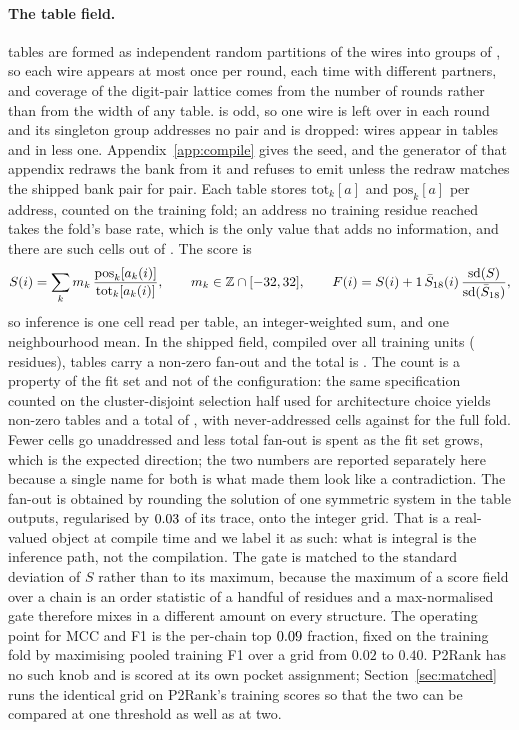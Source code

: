 \documentclass[11pt]{article}
\begin{document}
\paragraph{The table field.} \NTabTables{} tables are formed as \TabRounds{}
independent random partitions of the \NTabWires{} wires into groups of
\TabWidth{}, so each wire appears at most once per round, each time with
different partners, and coverage of the digit-pair lattice comes from the number
of rounds rather than from the width of any table. \NTabWires{} is odd, so one
wire is left over in each round and its singleton group addresses no pair and is
dropped: \NWireFull{} wires appear in \TabRounds{} tables and \NWireShort{} in
\TabRounds{} less one. Appendix~\ref{app:compile} gives the seed, and the
generator of that appendix redraws the bank from it and refuses to emit unless
the redraw matches the shipped bank pair for pair. Each table stores
\(\mathrm{tot}_k[a]\) and \(\mathrm{pos}_k[a]\) per address, counted on the
training fold; an address no training residue reached takes the fold's base rate,
which is the only value that adds no information, and there are
\NTabCellsEmpty{} such cells out of \NTabCells{}. The score is
\[
S(i)=\sum_{k} m_k\,\frac{\mathrm{pos}_k[a_k(i)]}{\mathrm{tot}_k[a_k(i)]},
\qquad m_k\in\mathbb{Z}\cap[-32{},32{}],
\qquad
F(i)=S(i)+1{}\,\bar{S}_{18{}}(i)\,
\frac{\mathrm{sd}(S)}{\mathrm{sd}(\bar S_{18{}})},
\]
so inference is one cell read per table, an integer-weighted sum, and one
neighbourhood mean. In the shipped field, compiled over all \NTrainUnits{}
training units (\NTabTrainRes{} residues), \NTabUsedFullFold{} tables carry a
non-zero fan-out and the total is \TabFanOut{}. The count is a property of the
fit set and not of the configuration: the same specification counted on the
cluster-disjoint selection half used for architecture choice yields
\NTabUsedFitHalf{} non-zero tables and a total of \TabFanOutFitHalf{}, with
\NTabCellsEmptyFitHalf{} never-addressed cells against \NTabCellsEmpty{} for the
full fold. Fewer cells go unaddressed and less total fan-out is spent as the fit
set grows, which is the expected direction; the two numbers are reported
separately here because a single name for both is what made them look like a
contradiction. The fan-out is obtained by rounding the solution of one symmetric
system in the table outputs, regularised by \(0.03{}\) of its trace, onto the
integer grid. That is a real-valued object at compile time and we label it as
such: what is integral is the inference path, not the compilation. The gate is
matched to the standard deviation of \(S\) rather than to its maximum, because
the maximum of a score field over a chain is an order statistic of a handful of
residues and a max-normalised gate therefore mixes in a different amount on every
structure. The operating point for MCC and F1 is the per-chain top
\(0.09{}\) fraction, fixed on the training fold by maximising pooled
training F1 over a grid from \(0.02\) to \(0.40\). P2Rank has no such knob and is
scored at its own pocket assignment; Section~\ref{sec:matched} runs the identical
grid on P2Rank's training scores so that the two can be compared at one threshold
as well as at two.
\end{document}
